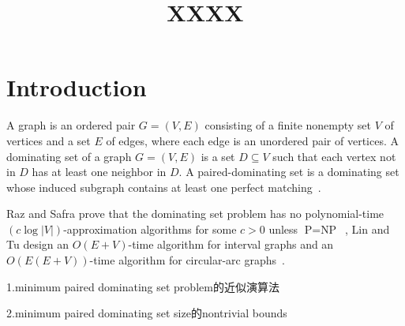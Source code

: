 \documentclass[12pt]{article}
\title{\textbf{XXXX}}
\date{}
\begin{document}
\maketitle

\section{Introduction}
A graph is an ordered pair $G=(V,E)$ consisting of a finite nonempty set $V$ of vertices and a set $E$ of edges, where each edge is an unordered pair of vertices. A dominating set of a graph $G=(V,E)$ is a set $D \subseteq V$ such that each vertex not in $D$ has at least one neighbor in $D$. A paired-dominating set is a dominating set whose induced subgraph contains at least one perfect matching~\cite{1}.


Raz and Safra prove that the dominating set problem has no polynomial-time $(c \log|V|)$-approximation algorithms for some $c > 0$ unless $\text{P}=\text{NP}$~\cite{2}, Lin and Tu design an $O(E+V)$-time algorithm for interval graphs and an $O(E(E+V))$-time algorithm for circular-arc graphs~\cite {3}.

1.minimum paired dominating set problem的近似演算法

2.minimum paired dominating set size的nontrivial bounds 






\end{document}
